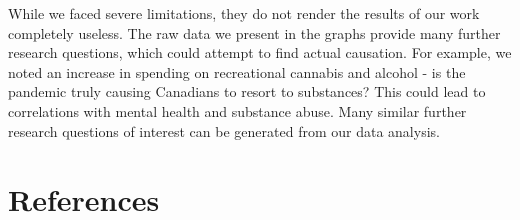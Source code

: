 \documentclass[fontsize=11pt]{article}
\begin{document}
\tab While we faced severe limitations, they do not render the results of our work completely useless. The raw data we present in the graphs provide many further research questions, which could attempt to find actual causation. For example, we noted an increase in spending on recreational cannabis and alcohol - is the pandemic truly causing Canadians to resort to substances? This could lead to correlations with mental health and substance abuse. Many similar further research questions of interest can be generated from our data analysis.\\

\section*{References}
\printbibliography[heading=none]
\end{document}
